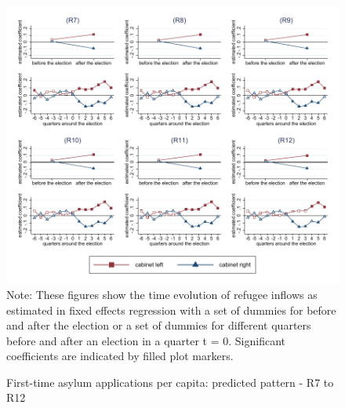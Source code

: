 \documentclass[11pt,a4paper]{scrartcl}
\begin{document}
\clearpage
\FloatBarrier


\clearpage
\FloatBarrier
\begin{figure}[!ht]
	\caption{First-time asylum applications per capita: predicted pattern - R7 to R12}
	\includegraphics[width=1\textwidth]{../results/applications/app_graphs_R7-R12.pdf}
	\scriptsize{Note: These figures show the time evolution of refugee inflows as estimated in fixed effects regression
		with a set of dummies for before and after the election or a set of dummies for different quarters before and after an election in a quarter t = 0. Significant coefficients are indicated by filled plot markers.}
\end{figure}

\clearpage
\FloatBarrier



\clearpage
\FloatBarrier


\clearpage
\FloatBarrier



\clearpage
\FloatBarrier

\end{document}
